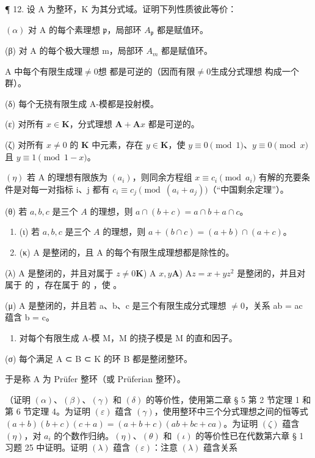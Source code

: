¶ 12. 设 A 为整环，K 为其分式域。证明下列性质彼此等价：

\((\alpha)\) 对 A 的每个素理想 \(\mathfrak{p}\)，局部环 \(A_{\mathfrak{p}}\) 都是赋值环。

(β) 对 A 的每个极大理想 m，局部环 \(A_{m}\) 都是赋值环。

 A 中每个有限生成理\(\neq0\)想  都是可逆的（因而有限\(\neq0\)生成分式理想  构成一个群）。

(δ) 每个无挠有限生成 A-模都是投射模。

(ε) 对所有 \(x \in \mathbf{K}\)，分式理想 \(\mathbf{A} + \mathbf{A}x\) 都是可逆的。

(ζ) 对所有 \(x \neq 0\) 的 \(\mathbf{K}\) 中元素，存在 \(y \in \mathbf{K}\)，使 \(y \equiv 0 \pmod{1}\)、\(y \equiv 0 \pmod{x}\) 且 \(y \equiv 1 \pmod{1 - x}\)。

\((\eta)\) 若 A 的理想有限族为 \((a_{i})\)，则同余方程组 \(x \equiv c_{i} \pmod{a_{i}}\) 有解的充要条件是对每一对指标 i、j 都有 \(c_{i} \equiv c_{j} \pmod{(a_{i} + a_{j})}\)（“中国剩余定理”）。

(θ) 若 \(a, b, c\) 是三个 \(A\) 的理想，则 \(a \cap (b + c) = a \cap b + a \cap c\)。

\begin{enumerate}
\def\labelenumi{(\roman{enumi})}
\item[(ι)]
(ι) 若 \(a, b, c\) 是三个 \(A\) 的理想，则 \(a + (b \cap c) = (a + b) \cap (a + c)\)。
\item[(κ)]
(κ) A 是整闭的，且 A 的每个有限生成理想都是除性的。
\end{enumerate}

(λ) A 是整闭的，并且对属于 \(z \neq 0\)\(\mathbf{K}\)) A \(x, y\)\(\mathbf{A}\)) A\(z = x + yz^2\) 是整闭的，并且对属于  的 ，存在属于  的 ，使 。

(μ) A 是整闭的，并且若 a、b、c 是三个有限生成分式理想 \(\neq0\)，关系 ab = ac 蕴含 b = c。

\begin{enumerate}
\def\labelenumi{(\alph{enumi})}
\setcounter{enumi}{21}
\tightlist
\item
  对每个有限生成 A-模 M，M 的挠子模是 M 的直和因子。
\end{enumerate}

(σ) 每个满足 A ⊂ B ⊂ K 的环 B 都是整闭整环。

于是称 A 为 Prüfer 整环（或 Prüferian 整环）。

（证明 \((\alpha)\)、\((\beta)\)、\((\gamma)\) 和 \((\delta)\) 的等价性，使用第二章 § 5 第 2 节定理 1 和第 6 节定理 4。为证明 \((\varepsilon)\) 蕴含 \((\gamma)\)，使用整环中三个分式理想之间的恒等式 \((a + b)(b + c)(c + a) = (a + b + c)(ab + bc + ca)\)。为证明 \((\zeta)\) 蕴含 \((\eta)\)，对 \(a_i\) 的个数作归纳。\((\eta)\)、\((\theta)\) 和 \((\iota)\) 的等价性已在代数第六章 § 1 习题 25 中证明。证明 \((\lambda)\) 蕴含 \((\varepsilon)\)：注意 \((\lambda)\) 蕴含关系

